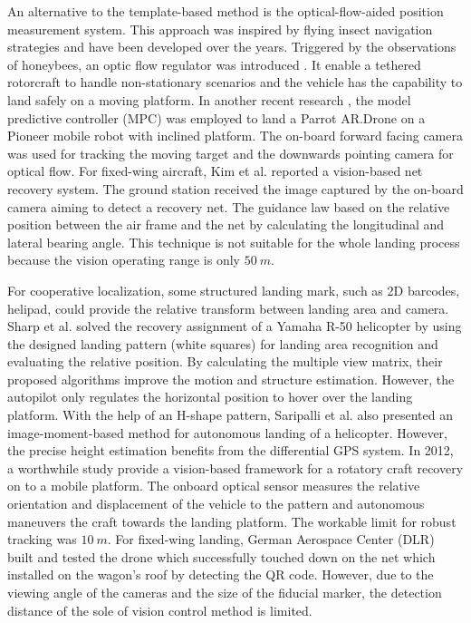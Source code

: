 An alternative to the template-based method is the optical-flow-aided position measurement system. This approach was inspired by flying insect navigation strategies and have been developed over the years. Triggered by the observations of honeybees, an optic flow regulator was introduced \cite{Ruffier2014}. It enable a tethered rotorcraft to handle non-stationary scenarios and the vehicle has the capability to land safely on a moving platform. In another recent research \cite{Vlantis2015}, the model predictive controller (MPC) was employed to land a Parrot AR.Drone on a Pioneer mobile robot with inclined platform. The on-board forward facing camera was used for tracking the moving target and the downwards pointing camera for optical flow. For fixed-wing aircraft, Kim et al.\cite{Kim2013} reported a vision-based net recovery system. The ground station received the image captured by the on-board camera aiming to detect a recovery net. The guidance law based on the relative position between the air frame and the net by calculating the longitudinal and lateral bearing angle. This technique is not suitable for the whole landing process because the vision operating range is only $50\ m$.



For cooperative localization, some structured landing mark, such as 2D barcodes, helipad, could provide the relative transform between landing area and camera. Sharp et al. \cite{Sharp2001} solved the recovery assignment of a Yamaha R-50 helicopter by using the designed landing pattern (white squares) for landing area recognition and evaluating the relative position. By calculating the multiple view matrix, their proposed algorithms\cite{Shakernia2002} improve the motion and structure estimation. However, the autopilot only regulates the horizontal position to hover over the landing platform. With the help of an H-shape pattern, Saripalli et al. \cite{Saripalli2003} also presented an image-moment-based method for autonomous landing of a helicopter. However, the precise height estimation benefits from the differential GPS system. In 2012, a worthwhile study \cite{richardsonautomated2013} provide a vision-based framework for a rotatory craft recovery on to a mobile platform. The onboard optical sensor measures the relative orientation and displacement of the vehicle to the pattern and autonomous maneuvers the craft towards the landing platform. The workable limit for robust tracking was $10\ m$. For fixed-wing landing, German Aerospace Center (DLR) built and tested the drone which successfully touched down on the net which installed on the wagon's roof by detecting the QR code\cite{DLR_Landing}. However, due to the viewing angle of the cameras and the size of the fiducial marker, the detection distance of the sole of vision control method is limited.


